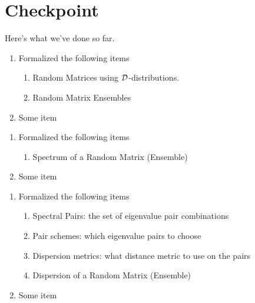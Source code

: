\section{Checkpoint}

Here's what we've done so far.



\begin{enumerate}
  \item Formalized the following items
    \begin{enumerate}
      \item Random Matrices using $\mathcal{D}$-distributions.
      \item Random Matrix Ensembles
    \end{enumerate}
  \item Some item
\end{enumerate}


\begin{enumerate}
    \item Formalized the following items
      \begin{enumerate}
        \item Spectrum of a Random Matrix (Ensemble)
      \end{enumerate}
    \item Some item
\end{enumerate}


\begin{enumerate}
    \item Formalized the following items
      \begin{enumerate}
        \item Spectral Pairs: the set of eigenvalue pair combinations
        \item Pair schemes: which eigenvalue pairs to choose
        \item Dispersion metrics: what distance metric to use on the pairs
        \item Dispersion of a Random Matrix (Ensemble)
      \end{enumerate}
    \item Some item
\end{enumerate}

